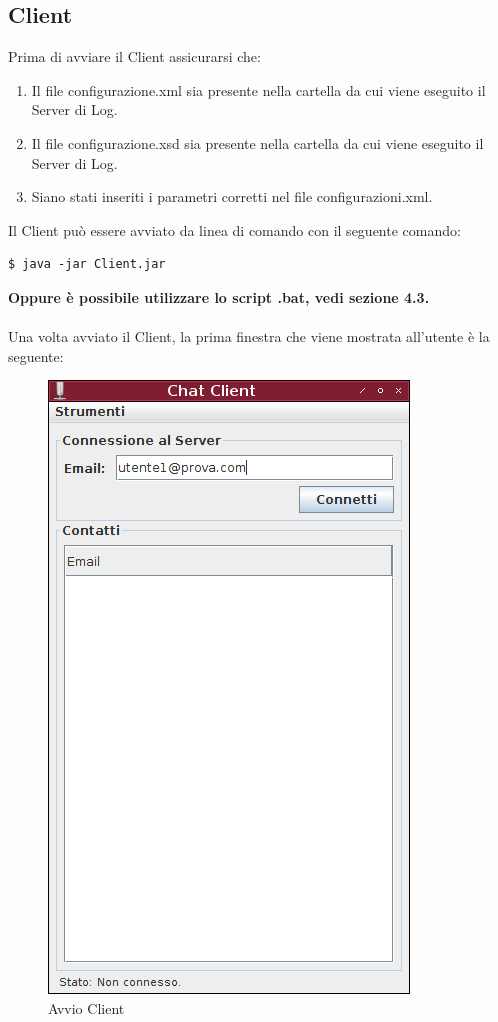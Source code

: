 \documentclass[a4paper, 11pt]{article} %
\begin{document}
\subsection{Client}
Prima di avviare il Client assicurarsi che:
\begin{enumerate}
\item Il file configurazione.xml sia presente nella cartella da cui viene eseguito il Server di Log.
\item Il file configurazione.xsd sia presente nella cartella da cui viene eseguito il Server di Log.
\item Siano stati inseriti i parametri corretti nel file configurazioni.xml.
\end{enumerate}
Il Client pu\`o essere avviato da linea di comando con il seguente comando:
\lstset{language=bash}
\begin{lstlisting}[frame=single]
$ java -jar Client.jar
\end{lstlisting}
\textbf{Oppure \`e possibile utilizzare lo script .bat, vedi sezione 4.3.}\\
\\
Una volta avviato il Client, la prima finestra che viene mostrata all'utente \`e la seguente:
\begin{figure}[H]
\includegraphics[height=1.2\textwidth]{images/client-1.png}
\vspace{-0.2cm}
\caption{Avvio Client}
\end{figure}
\end{document}
